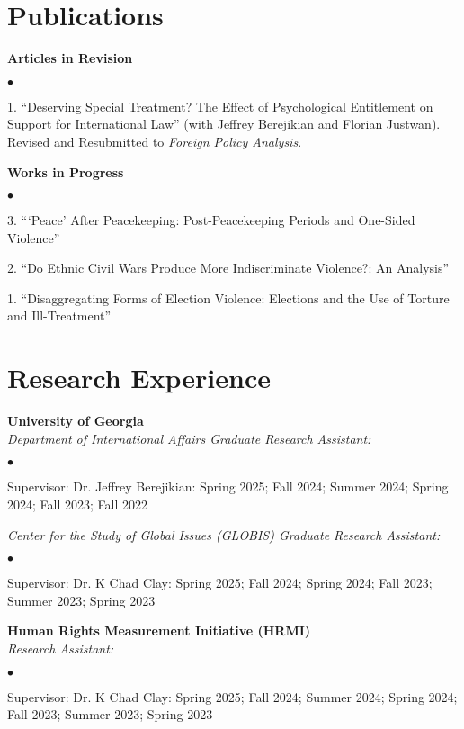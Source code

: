 \documentclass[letterpaper,12pt]{article}
\newenvironment{list2}{
  \begin{list}{$\bullet$}{%
      \setlength{\itemsep}{0in}
      \setlength{\parsep}{0in} 
      \setlength{\parskip}{0in}
      \setlength{\topsep}{0in} 
      \setlength{\partopsep}{0in}
      \setlength{\leftmargin}{1in}
      \setlength{\labelsep}{1em}
      \setlength{\labelwidth}{1em}
      \setlength{\itemindent}{-2em}
      \setlength{\listparindent}{2em}}}{\end{list}}
\begin{document}
\section{Publications}
\textbf{Articles in Revision}
\par
\begin{list2}
    \item[1.] ``Deserving Special Treatment? The Effect of Psychological Entitlement on Support for \mbox{International} Law” (with Jeffrey Berejikian and Florian Justwan). Revised and Resubmitted to \textit{Foreign \mbox{Policy} Analysis}.
\end{list2}
\par
\textbf{Works in Progress}
\par
\begin{list2}
    \item[3.] ```Peace' After Peacekeeping: Post-Peacekeeping Periods and One-Sided Violence”
    \item[2.] ``Do Ethnic Civil Wars Produce More Indiscriminate Violence?: An Analysis”
    \item[1.] ``Disaggregating Forms of Election Violence: Elections and the Use of Torture and Ill-Treatment” 
\end{list2}

\section{Research Experience}
\textbf{University of Georgia}\\
\textit{Department of International Affairs Graduate Research Assistant:}
\begin{list2}
    \item Supervisor: Dr. Jeffrey Berejikian: Spring 2025; Fall 2024; Summer 2024; Spring 2024; Fall 2023; Fall 2022
\end{list2}
\par
\textit{Center for the Study of Global Issues (GLOBIS) Graduate Research Assistant:}
\begin{list2}
    \item Supervisor: Dr. K Chad Clay: Spring 2025; Fall 2024; Spring 2024; Fall 2023; Summer 2023; Spring 2023
\end{list2}
\par
\textbf{Human Rights Measurement Initiative (HRMI)}\\
\textit{Research Assistant:}
\begin{list2}
    \item Supervisor: Dr. K Chad Clay: Spring 2025; Fall 2024; Summer 2024; Spring 2024; Fall 2023; Summer 2023; Spring 2023
\end{list2}
\end{document}
